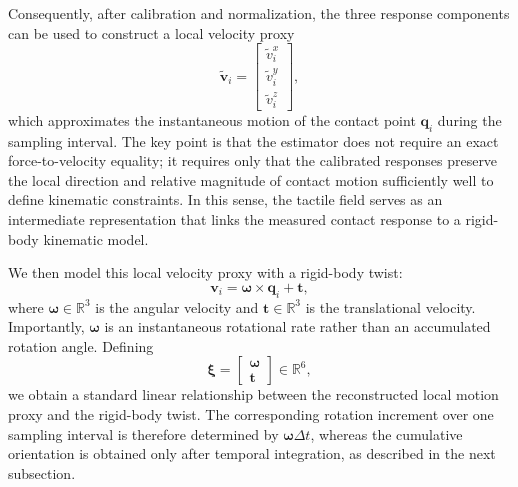 \documentclass[letterpaper,10pt,journal,twoside]{IEEEtran}
\begin{document}
Consequently, after calibration and normalization, the three response components can be used to construct a local velocity proxy
\begin{equation}
\tilde{\mathbf{v}}_i =
\begin{bmatrix}
\tilde{v}^x_i \\
\tilde{v}^y_i \\
\tilde{v}^z_i
\end{bmatrix},
\end{equation}
which approximates the instantaneous motion of the contact point $\mathbf{q}_i$ during the sampling interval. The key point is that the estimator does not require an exact force-to-velocity equality; it requires only that the calibrated responses preserve the local direction and relative magnitude of contact motion sufficiently well to define kinematic constraints. In this sense, the tactile field serves as an intermediate representation that links the measured contact response to a rigid-body kinematic model.



We then model this local velocity proxy with a rigid-body twist:
\begin{equation}
\mathbf{v}_i = \boldsymbol{\omega} \times \mathbf{q}_i + \mathbf{t},
\end{equation}
where $\boldsymbol{\omega} \in \mathbb{R}^3$ is the angular velocity and $\mathbf{t} \in \mathbb{R}^3$ is the translational velocity. Importantly, $\boldsymbol{\omega}$ is an instantaneous rotational rate rather than an accumulated rotation angle. Defining
\begin{equation}
\boldsymbol{\xi} =
\begin{bmatrix}
\boldsymbol{\omega} \\
\mathbf{t}
\end{bmatrix}
\in \mathbb{R}^6,
\end{equation}
we obtain a standard linear relationship between the reconstructed local motion proxy and the rigid-body twist. The corresponding rotation increment over one sampling interval is therefore determined by $\boldsymbol{\omega}\Delta t$, whereas the cumulative orientation is obtained only after temporal integration, as described in the next subsection.
\end{document}
